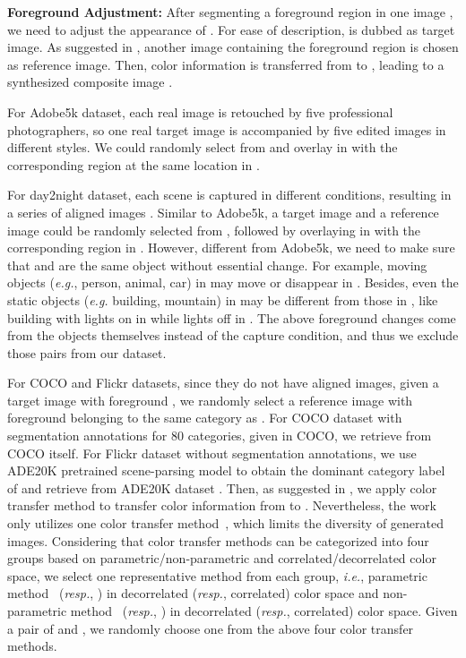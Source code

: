 \documentclass[10pt,twocolumn,letterpaper]{article}
\begin{document}
\noindent\textbf{Foreground Adjustment: }After segmenting a foreground region  in one image , we need to adjust the appearance of . For ease of description,  is dubbed as target image. As suggested in \cite{tsai2017deep}, another image  containing the foreground region  is chosen as reference image. Then, color information is transferred from  to , leading to a synthesized composite image .

For Adobe5k dataset, each real image is retouched by five professional photographers, so one real target image  is accompanied by five edited images  in different styles. We could randomly select  from  and overlay  in  with the corresponding region  at the same location in .

For day2night dataset, each scene is captured in different conditions, resulting in a series of aligned images . Similar to Adobe5k, a target image  and a reference image  could be randomly selected from , followed by overlaying  in  with the corresponding region  in . However, different from Adobe5k, we need to make sure that  and  are the same object without essential change. For example, moving objects (\emph{e.g.}, person, animal, car) in  may move or disappear in . Besides, even the static objects (\emph{e.g.} building, mountain) in  may be different from those in , like building with lights on in  while lights off in . The above foreground changes come from the objects themselves instead of the capture condition, and thus we exclude those pairs from our dataset.

For COCO and Flickr datasets, since they do not have aligned images, given a target image  with foreground , we randomly select a reference image  with foreground  belonging to the same category as . For COCO dataset with segmentation annotations for 80 categories, given  in COCO, we retrieve  from COCO itself. For Flickr dataset without segmentation annotations, we use ADE20K pretrained scene-parsing model \cite{zhou2019semantic} to obtain the dominant category label of  and retrieve  from ADE20K dataset \cite{zhou2019semantic}. Then, as suggested in \cite{tsai2017deep}, we apply color transfer method to transfer color information from  to . Nevertheless, the work \cite{tsai2017deep} only utilizes one color transfer method~\cite{lee2016automatic}, which limits the diversity of generated images. Considering that color transfer methods can be categorized into four groups based on parametric/non-parametric and correlated/decorrelated color space, we select one representative method from each group, \emph{i.e.}, parametric method~\cite{reinhard2001color} (\emph{resp.}, \cite{xiao2006color}) in decorrelated (\emph{resp.}, correlated) color space and non-parametric method~\cite{fecker2008histogram} (\emph{resp.}, \cite{pitie2007automated}) in decorrelated (\emph{resp.}, correlated) color space. Given a pair of  and , we randomly choose one from the above four color transfer methods.
\end{document}
